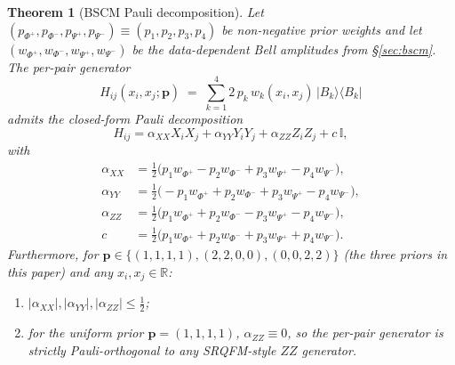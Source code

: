 \documentclass[pdflatex,sn-mathphys-num]{sn-jnl}
\theoremstyle{thmstyleone}
\newtheorem{theorem}{Theorem}
\theoremstyle{thmstyletwo}
\theoremstyle{thmstylethree}
\begin{document}
\begin{theorem}[BSCM Pauli decomposition]\label{thm:bscm-pauli}
Let
$(p_{\Phi^+}, p_{\Phi^-}, p_{\Psi^+}, p_{\Psi^-}) \equiv (p_1, p_2, p_3, p_4)$
be non-negative prior weights and let
$(w_{\Phi^+}, w_{\Phi^-}, w_{\Psi^+}, w_{\Psi^-})$ be the data-dependent
Bell amplitudes from \S\ref{sec:bscm}. The per-pair generator
\[
H_{ij}(x_i, x_j; \boldsymbol{p})
\;=\; \sum_{k=1}^{4} 2\, p_k\, w_k(x_i, x_j)\, |B_k\rangle\!\langle B_k|
\]
admits the closed-form Pauli decomposition
\[
H_{ij} = \alpha_{XX} X_iX_j + \alpha_{YY} Y_iY_j + \alpha_{ZZ} Z_iZ_j + c\,\mathbb{I},
\]
with
\begin{align*}
\alpha_{XX} &= \tfrac12\bigl(p_1 w_{\Phi^+} - p_2 w_{\Phi^-} + p_3 w_{\Psi^+} - p_4 w_{\Psi^-}\bigr),\\
\alpha_{YY} &= \tfrac12\bigl(-p_1 w_{\Phi^+} + p_2 w_{\Phi^-} + p_3 w_{\Psi^+} - p_4 w_{\Psi^-}\bigr),\\
\alpha_{ZZ} &= \tfrac12\bigl(p_1 w_{\Phi^+} + p_2 w_{\Phi^-} - p_3 w_{\Psi^+} - p_4 w_{\Psi^-}\bigr),\\
c &= \tfrac12\bigl(p_1 w_{\Phi^+} + p_2 w_{\Phi^-} + p_3 w_{\Psi^+} + p_4 w_{\Psi^-}\bigr).
\end{align*}
Furthermore, for $\boldsymbol{p}\in\{(1,1,1,1),(2,2,0,0),(0,0,2,2)\}$
(the three priors in this paper) and any $x_i, x_j\in\mathbb{R}$:
\begin{enumerate}
\item[(a)] $|\alpha_{XX}|, |\alpha_{YY}|, |\alpha_{ZZ}|\le \tfrac12$;
\item[(b)] for the uniform prior $\boldsymbol{p}=(1,1,1,1)$,
$\alpha_{ZZ}\equiv 0$, so the per-pair generator is strictly
Pauli-orthogonal to any SRQFM-style $ZZ$ generator.
\end{enumerate}
\end{theorem}
\end{document}
